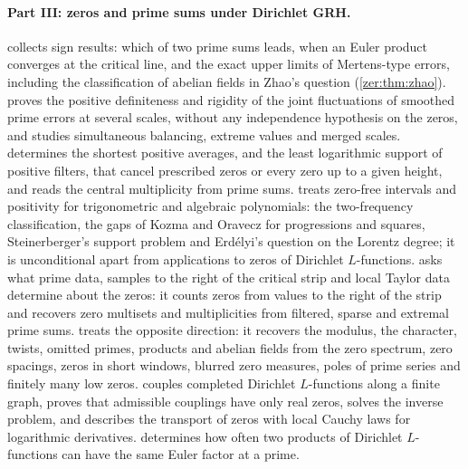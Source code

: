 \paragraph{Part III: zeros and prime sums under Dirichlet GRH.}
 collects sign results: which of two prime sums leads, when an Euler product
converges at the critical line, and the exact upper limits of Mertens-type errors, including
the classification of abelian fields in Zhao's question (\cref{zer:thm:zhao}).
 proves the positive definiteness and rigidity of the joint fluctuations of
smoothed prime errors at several scales, without any independence hypothesis on the zeros,
and studies simultaneous balancing, extreme values and merged scales. 
determines the shortest positive averages, and the least logarithmic support of positive
filters, that cancel prescribed zeros or every zero up to a given height, and reads the
central multiplicity from prime sums.  treats zero-free intervals and positivity
for trigonometric and algebraic polynomials: the two-frequency classification, the gaps of Kozma
and Oravecz for progressions and squares, Steinerberger's support problem and Erd\'elyi's question
on the Lorentz degree; it is unconditional apart from applications to zeros of Dirichlet
$L$-functions.  asks what prime data, samples to the
right of the critical strip and local Taylor data determine about the zeros: it counts zeros
from values to the right of the strip and recovers zero multisets and multiplicities from
filtered, sparse and extremal prime sums.  treats the opposite direction: it
recovers the modulus, the character, twists, omitted primes, products and abelian fields from
the zero spectrum, zero spacings, zeros in short windows, blurred zero measures, poles of prime
series and finitely many low zeros.  couples completed Dirichlet $L$-functions
along a finite graph, proves that admissible couplings have only real zeros, solves the
inverse problem, and describes the transport of zeros with local Cauchy laws for logarithmic
derivatives.  determines how often two products of Dirichlet $L$-functions can
have the same Euler factor at a prime.

